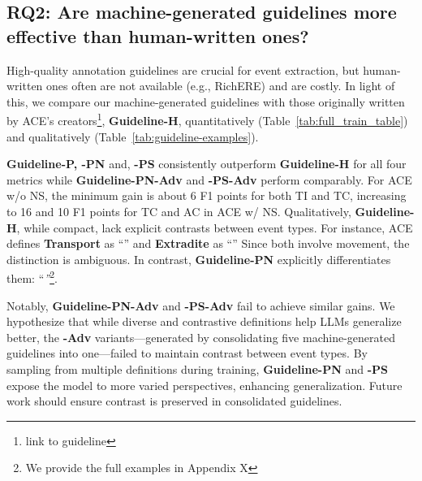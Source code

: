 

\subsection{RQ2: Are machine-generated guidelines more effective than human-written ones?}
High-quality annotation guidelines are crucial for event extraction, but human-written ones often are not available (e.g., RichERE) and are costly. In light of this, we compare our machine-generated guidelines with those originally written by ACE's creators\footnote{link to guideline}, \textbf{Guideline-H},  quantitatively (Table~\ref{tab:full_train_table}) and qualitatively (Table~\ref{tab:guideline-examples}).

\textbf{Guideline-P, -PN} {and}, \textbf{-PS} consistently outperform \textbf{Guideline-H} for all four metrics while \textbf{Guideline-PN-Adv} and \textbf{-PS-Adv} perform comparably. For ACE w/o NS, the minimum gain is about 6 F1 points for both TI and TC, increasing to 16 and 10 F1 points for TC and AC in ACE w/ NS. Qualitatively, \textbf{Guideline-H}, while compact, lack explicit contrasts between event types. For instance, ACE defines \textbf{Transport} as ``\textit{}'' and  \textbf{Extradite} as ``\textit{}'' Since both involve movement, the distinction is ambiguous. In contrast, \textbf{Guideline-PN} explicitly differentiates them: ``\textit{''}\footnote{We provide the full examples in Appendix X}.      

Notably, \textbf{Guideline-PN-Adv} and \textbf{-PS-Adv} fail to achieve similar gains. We hypothesize that while diverse and contrastive definitions help LLMs generalize better, the \textbf{-Adv} variants—generated by consolidating five machine-generated guidelines into one—failed to maintain contrast between event types. By sampling from multiple definitions during training, \textbf{Guideline-PN} and \textbf{-PS} expose the model to more varied perspectives, enhancing generalization. Future work should ensure contrast is preserved in consolidated guidelines.    

